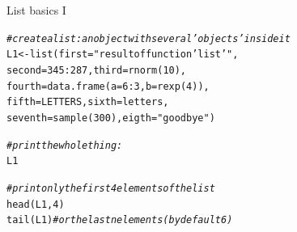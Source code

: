 \documentclass[xcolor=table,       handout,    xcolor=dvipsnames]{beamer}\usepackage[]{graphicx}\usepackage[]{color}
\makeatletter
\newcommand{\hlnum}[1]{\textcolor[rgb]{0,0,0}{#1}}
\newcommand{\hlstr}[1]{\textcolor[rgb]{0.545,0.137,0.137}{#1}}
\newcommand{\hlcom}[1]{\textcolor[rgb]{0,0.392,0}{\textit{#1}}}
\newcommand{\hlopt}[1]{\textcolor[rgb]{0,0,0}{#1}}
\newcommand{\hlstd}[1]{\textcolor[rgb]{0,0,0}{#1}}
\newcommand{\hlkwb}[1]{\textcolor[rgb]{0,0,0}{#1}}
\newcommand{\hlkwc}[1]{\textcolor[rgb]{1,0,1}{#1}}
\newcommand{\hlkwd}[1]{\textcolor[rgb]{0,0,1}{#1}}
\newenvironment{kframe}{%
 \def\at@end@of@kframe{}%
 \ifinner\ifhmode%
  \def\at@end@of@kframe{\end{minipage}}%
  \begin{minipage}{\columnwidth}%
 \fi\fi%
 \def\FrameCommand##1{\hskip\@totalleftmargin \hskip-\fboxsep
 \colorbox{shadecolor}{##1}\hskip-\fboxsep
     \hskip-\linewidth \hskip-\@totalleftmargin \hskip\columnwidth}%
 \MakeFramed {\advance\hsize-\width
   \@totalleftmargin\z@ \linewidth\hsize
   \@setminipage}}%
 {\par\unskip\endMakeFramed%
 \at@end@of@kframe}
\newenvironment{knitrout}{}{} %
\makeatother
\begin{document}
\begin{frame}[fragile]{List basics I}
\begin{knitrout}
\color{fgcolor}\begin{kframe}
\begin{alltt}
\hlcom{# create a list: an object with several 'objects' inside it}
\hlstd{L1} \hlkwb{<-} \hlkwd{list}\hlstd{(}\hlkwc{first}\hlstd{=}\hlstr{"result of function 'list'"}\hlstd{,}
           \hlkwc{second}\hlstd{=}\hlnum{345}\hlopt{:}\hlnum{287}\hlstd{,} \hlkwc{third}\hlstd{=}\hlkwd{rnorm}\hlstd{(}\hlnum{10}\hlstd{),}
           \hlkwc{fourth}\hlstd{=}\hlkwd{data.frame}\hlstd{(}\hlkwc{a}\hlstd{=}\hlnum{6}\hlopt{:}\hlnum{3}\hlstd{,} \hlkwc{b}\hlstd{=}\hlkwd{rexp}\hlstd{(}\hlnum{4}\hlstd{)),}
           \hlkwc{fifth}\hlstd{=LETTERS,} \hlkwc{sixth}\hlstd{=letters,}
           \hlkwc{seventh}\hlstd{=}\hlkwd{sample}\hlstd{(}\hlnum{300}\hlstd{),} \hlkwc{eigth}\hlstd{=}\hlstr{"goodbye"}\hlstd{)}
\end{alltt}
\end{kframe}
\end{knitrout}
\pause
\begin{knitrout}
\color{fgcolor}\begin{kframe}
\begin{alltt}
\hlcom{# print the whole thing:}
\hlstd{L1}
\end{alltt}
\end{kframe}
\end{knitrout}
\pause
\begin{knitrout}
\color{fgcolor}\begin{kframe}
\begin{alltt}
\hlcom{# print only the first 4 elements of the list}
\hlkwd{head}\hlstd{(L1,}\hlnum{4}\hlstd{)}
\hlkwd{tail}\hlstd{(L1)} \hlcom{# or the last n elements (by default 6)}
\end{alltt}
\end{kframe}
\end{knitrout}
\end{frame}

\end{document}
